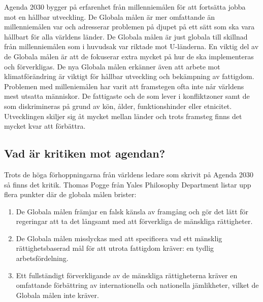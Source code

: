 \documentclass{report}
\begin{document}
Agenda 2030 bygger på erfarenhet från millenniemålen för att fortsätta jobba mot en hållbar utveckling. \cite{webEuropeanComission}
De Globala målen är mer omfattande än millenniemålen var och adresserar problemen på djupet på ett sätt som ska vara hållbart för alla världens länder. De Globala målen är just globala till skillnad från millenniemålen som i huvudsak var riktade mot U-länderna. En viktig del av de Globala målen är att de fokuserar extra mycket på hur de ska implementeras och förverkligas. De nya Globala målen erkänner även att arbete mot klimatförändring är viktigt för hållbar utveckling och bekämpning av fattigdom. \cite{web2030agenda}
Problemen med milleniemålen har varit att framstegen ofta inte når världens mest utsatta människor. De fattigaste och de som lever i konfliktzoner samt de som diskrimineras på grund av kön, ålder, funktionshinder eller etnicitet. Utvecklingen skiljer sig åt mycket mellan länder och trots framsteg finns det  mycket kvar att förbättra. \cite{MIllennium} \\

\subsection{Vad är kritiken mot agendan?} 
Trots de höga förhoppningarna från världens ledare som skrivit på Agenda 2030 så finns det kritik. Thomas Pogge \cite{critique} från Yales Philosophy Department listar upp flera punkter där de globala målen brister: 

\begin{enumerate}
\item De Globala målen främjar en falsk känsla av framgång och gör det lätt för regeringar att ta det långsamt med att förverkliga de mänskliga rättigheter. 
\item De Globala målen misslyckas med att specificera vad ett mänsklig rättighetsbaserad mål för att utrota fattigdom kräver: en tydlig arbetsfördelning. 
\item Ett fullständigt förverkligande av de mänskliga rättigheterna kräver en omfattande förbättring av internationella och nationella jämlikheter, vilket de Globala målen inte kräver. 
\end{enumerate} 
\cite{critique}\\
\end{document}
